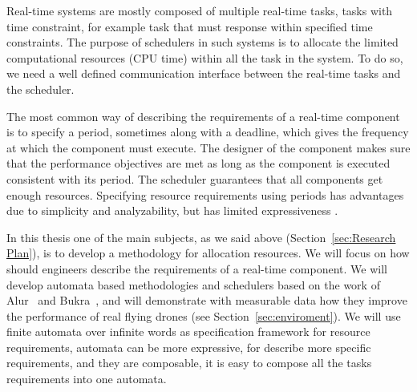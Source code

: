 \documentclass[11pt]{article}
\begin{document}
Real-time systems are mostly composed of multiple real-time tasks, tasks with time constraint, for example task that must response within specified time constraints. 
The purpose of schedulers in such systems is to allocate the limited computational resources (CPU time) within all the task in the system. To do so, we need a well defined communication interface between the real-time tasks and the scheduler.

The most common way of describing the requirements of a real-time component is to specify a period, sometimes along with a deadline, which gives the frequency at which the component must execute. The designer of the component makes sure that the performance objectives are met as long as the component is executed consistent with its period. The scheduler guarantees that all components get enough resources.
Specifying resource requirements using periods has advantages due to simplicity and analyzability, but has limited expressiveness \cite{RTComposer}. 

In this thesis one of the main subjects, as we said above (Section~\ref{sec:Research Plan}), is to develop a methodology for allocation resources. We will focus on how should engineers describe the requirements of a real-time component.
We will develop automata based methodologies and schedulers based on the work of Alur~\cite{RTComposer} and Bukra~\cite{Merav}, and will demonstrate with measurable data how they improve the performance of real flying drones (see Section~\ref{sec:enviroment}).
We will use finite automata over infinite words as specification framework for resource requirements, automata can be more expressive, for describe more specific requirements, and they are composable, it is easy to compose all the tasks requirements into one automata. 
\end{document}
